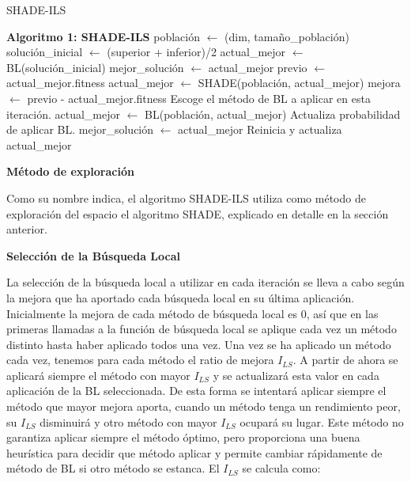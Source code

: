 \begin{algorithm}
\caption{SHADE-ILS}
\begin{algorithmic}[1]
\STATE \textbf{Algoritmo 1: SHADE-ILS}
\STATE población $\leftarrow$ (dim, tamaño\_población)
\STATE solución\_inicial $\leftarrow$ (superior + inferior)/2
\STATE actual\_mejor $\leftarrow$ BL(solución\_inicial)
\STATE mejor\_solución $\leftarrow$ actual\_mejor
    \STATE previo $\leftarrow$ actual\_mejor.fitness
    \STATE actual\_mejor $\leftarrow$ SHADE(población, actual\_mejor)
    \STATE mejora $\leftarrow$ previo - actual\_mejor.fitness
    \STATE Escoge el método de BL a aplicar en esta iteración.
    \STATE actual\_mejor $\leftarrow$ BL(población, actual\_mejor)
    \STATE Actualiza probabilidad de aplicar BL.
        \STATE mejor\_solución $\leftarrow$ actual\_mejor
    \ENDIF
        \STATE Reinicia y actualiza actual\_mejor
    \ENDIF
\ENDWHILE
\end{algorithmic}
\end{algorithm}

\vspace{10px}

\noindent\textbf{Método de exploración}

Como su nombre indica, el algoritmo SHADE-ILS utiliza como método de exploración del espacio el algoritmo SHADE, explicado en detalle en la sección anterior.

\vspace{10px}

\noindent\textbf{Selección de la Búsqueda Local}

La selección de la búsqueda local a utilizar en cada iteración se lleva a cabo según la mejora que ha aportado cada búsqueda local en su última aplicación. Inicialmente la mejora de cada método de búsqueda local es $0$, así que en las primeras llamadas a la función de búsqueda local se aplique cada vez un método distinto hasta haber aplicado todos una vez. Una vez se ha aplicado un método cada vez, tenemos para cada método el ratio de mejora \( I_{LS} \). A partir de ahora se aplicará siempre el método con mayor \( I_{LS} \) y se actualizará esta valor en cada aplicación de la BL seleccionada. De esta forma se intentará aplicar siempre el método que mayor mejora aporta, cuando un método tenga un rendimiento peor, su \( I_{LS} \) disminuirá y otro método con mayor \( I_{LS} \) ocupará su lugar. Este método no garantiza aplicar siempre el método óptimo, pero proporciona una buena heurística para decidir que método aplicar y permite cambiar rápidamente de método de BL si otro método se estanca. El \( I_{LS} \) se calcula como:

